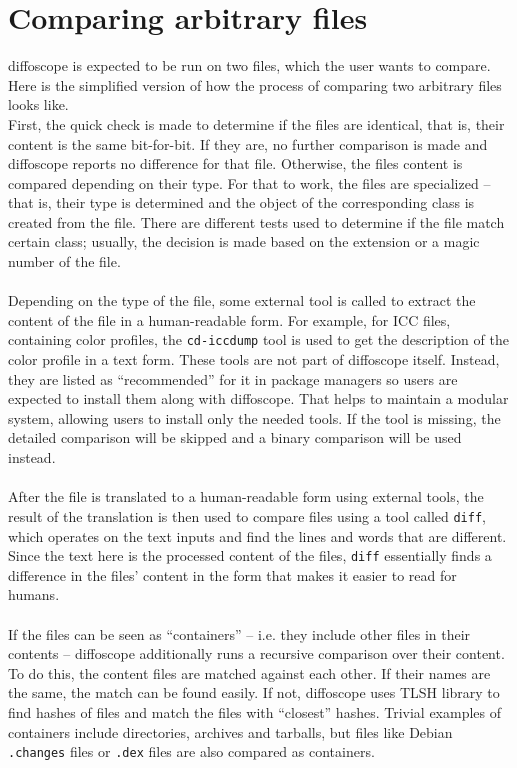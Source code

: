 \section[Comparing arbitrary files]{Comparing arbitrary files}

diffoscope is expected to be run on two files, which the user wants to compare. Here is the simplified version of how the process of comparing two arbitrary files looks like.\\
First, the quick check is made to determine if the files are identical, that is, their content is the same bit-for-bit. If they are, no further comparison is made and diffoscope reports no difference for that file. 
Otherwise, the files content is compared depending on their type. For that to work, the files are specialized -- that is, their type is determined and the object of the corresponding class is created from the file. There are different tests used to determine if the file match certain class; usually, the decision is made based on the extension or a magic number of the file.\\\\
Depending on the type of the file, some external tool is called to extract the content of the file in a human-readable form. For example, for ICC files, containing color profiles, the \texttt{cd-iccdump} tool is used to get the description of the color profile in a text form. These tools are not part of diffoscope itself. Instead, they are listed as ``recommended'' for it in package managers so users are expected to install them along with diffoscope. That helps to maintain a modular system, allowing users to install only the needed tools. If the tool is missing, the detailed comparison will be skipped and a binary comparison will be used instead.\\\\
After the file is translated to a human-readable form using external tools, the result of the translation is then used to compare files using a tool called \texttt{diff}, which operates on the text inputs and find the lines and words that are different. Since the text here is the processed content of the files, \texttt{diff} essentially finds a difference in the files' content in the form that makes it easier to read for humans.\\\\
If the files can be seen as ``containers'' -- i.e. they include other files in their contents -- diffoscope additionally runs a recursive comparison over their content. To do this, the content files are matched against each other. If their names are the same, the match can be found easily. If not, diffoscope uses TLSH library\autocite{oliver2013tlsh} to find hashes of files and match the files with ``closest'' hashes. Trivial examples of containers include directories, archives and tarballs, but files like Debian \texttt{.changes} files or \texttt{.dex} files are also compared as containers.\\\\
